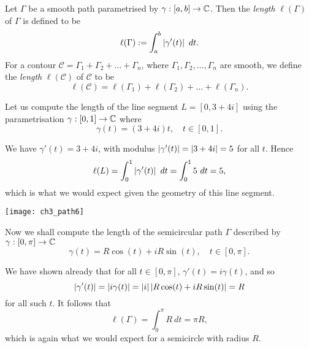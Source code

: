 \begin{definition}
Let $\Gamma$ be a smooth path parametrised by $\gamma:[a,b] \to \mathbb{C}$.  Then the \emph{length} $\ell ( \Gamma)$ of $\Gamma$ is defined to be
\[
\ell ( \Gamma ) : = \int_a^b \left|  \gamma '(t)  \right| \ dt.
\]
For a contour $\mathcal{C} = \Gamma_1+\Gamma_2 + \ldots + \Gamma_n$, where $\Gamma_1,\Gamma_2, \ldots , \Gamma_n$ are smooth, we define the \emph{length} $\ell ( \mathcal{C} )$ of $\mathcal{C}$ to be
\[
\ell ( \mathcal{C} ) = \ell ( \Gamma_1 ) + \ell ( \Gamma_2 ) + \ldots + \ell ( \Gamma_n).
\]
\end{definition}


\begin{example}
Let us compute the length of the line segment $L=[0,3+4i]$ using the parametrisation $\gamma: [0,1] \to \mathbb{C}$ where
\[
\gamma (t) = (3+4i)t, \quad t \in [0,1].
\]
\end{example}
\begin{solution}
We have $\gamma'(t)=3+4i$, with modulus $\left| \gamma'(t) \right| = \left| 3+4i \right|=5$ for all $t$.  Hence
\[
\ell (L) = \int_0^1 \left| \gamma'(t) \right| \ dt = \int_0^1 5\ dt = 5,
\]
which is what we would expect given the geometry of this line segment.
\begin{center}
\texttt{[image: ch3\_path6]}
\end{center}
\end{solution}
\begin{example}

Now we shall compute the length of the semicircular path $\Gamma$ described by $\gamma : [0,\pi] \to \mathbb{C}$
\[
\gamma (t) = R \cos (t) + i R \sin (t), \quad t \in [0,\pi].
\]
\end{example}
\begin{solution}
We have shown already that for all $t\in [0,\pi]$, $\gamma'(t)=i\gamma(t)$, and so
\[
\left| \gamma'(t) \right| = \left| i \gamma (t) \right| = \left| i \right| \left|  R \cos(t)+iR\sin(t) \right| = R
\]
for all such $t$.  It follows that
\[
\ell ( \Gamma ) = \int_0^{\pi} R\ dt = \pi R,
\]
which is again what we would expect for a semicircle with radius $R$.

\end{solution}

